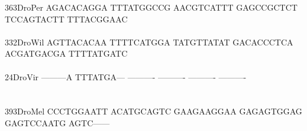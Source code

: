 \documentclass[11pt,twoside,reqno,a4paper]{article}
\begin{document}
{363\hspace*{1\charwidth}DroPer	AGACACAGGA	TTTATGGCCG	AACGTCATTT	GAGCCGCTCT	TCCAGTACTT	TTTACGGAAC	\\
\hspace*{4\charwidth}\hspace*{7\charwidth}\hspace*{1\charwidth}\hspace*{1\charwidth}\hspace*{1\charwidth}\hspace*{1\charwidth}\hspace*{1\charwidth}\hspace*{1\charwidth}\\
332\hspace*{1\charwidth}DroWil	AGTTACACAA	TTTTCATGGA	TATGTTATAT	GACACCCTCA	ACGATGACGA	TTTTATGATC	\\
\hspace*{4\charwidth}\hspace*{7\charwidth}\hspace*{1\charwidth}\hspace*{1\charwidth}\hspace*{1\charwidth}\hspace*{1\charwidth}\hspace*{1\charwidth}\hspace*{1\charwidth}\\
24\hspace*{2\charwidth}DroVir	---------A	TTTATGA---	----------	----------	----------	----------	\\
\hspace*{4\charwidth}\hspace*{7\charwidth}\hspace*{1\charwidth}\hspace*{1\charwidth}\hspace*{1\charwidth}\hspace*{1\charwidth}\hspace*{1\charwidth}\hspace*{1\charwidth}\\
\\
393\hspace*{1\charwidth}DroMel	CCCTGGAATT	ACATGCAGTC	GAAGAAGGAA	GAGAGTGGAG	GAGTCCAATG	AGTC------	\\
\hspace*{4\charwidth}\hspace*{7\charwidth}\hspace*{1\charwidth}\hspace*{1\charwidth}\hspace*{1\charwidth}\hspace*{1\charwidth}\hspace*{1\charwidth}\hspace*{1\charwidth}\\
}
\end{document}
